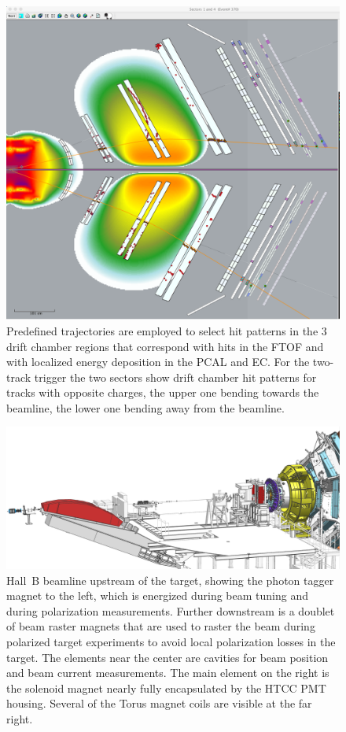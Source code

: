 \documentclass[final,3p,twocolumn]{elsarticle}
\begin{document}
\begin{figure}[htbp!]
\centerline{\includegraphics[width=0.95\columnwidth]{trigger.png}}
\caption{Predefined trajectories are employed to select hit patterns
in the 3 drift chamber regions that correspond with hits in the FTOF and with localized energy deposition in the 
PCAL and EC. For the two-track trigger the two sectors show drift chamber hit patterns for tracks with opposite
charges, the upper one bending towards the beamline, the lower one bending away from the beamline.}
\label{trigger}
\end{figure}    

\begin{figure}[htbp!]
\centerline{\includegraphics[width=2.0\columnwidth]{beamline-1.png}}
\caption{Hall~B beamline upstream of the target, showing the photon tagger magnet to the left, which is energized
during beam tuning and during polarization measurements. Further downstream is a doublet of beam raster magnets
that are used to raster the beam during polarized target experiments to avoid local polarization losses in the target.
The elements near the center are cavities for beam position and beam current measurements. The main element 
on the right is the solenoid magnet nearly fully encapsulated by the HTCC PMT housing. Several of the Torus magnet
coils are visible at the far right.}
\label{beamline-upstream}
\end{figure}
\end{document}
